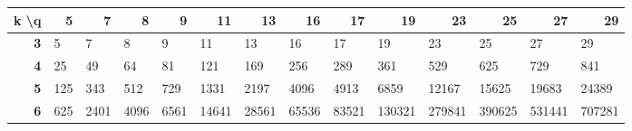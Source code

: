 \begin{table}[ht]
\centering
\tiny
\begin{tabular}{|r|lllllllllllll}
\hline
\multicolumn{1}{|l|}{\textbf{k \textbackslash q}} & \multicolumn{1}{r|}{\textbf{5}} & \multicolumn{1}{r|}{\textbf{7}} & \multicolumn{1}{r|}{\textbf{8}} & \multicolumn{1}{r|}{\textbf{9}} & \multicolumn{1}{r|}{\textbf{11}} & \multicolumn{1}{r|}{\textbf{13}} & \multicolumn{1}{r|}{\textbf{16}} & \multicolumn{1}{r|}{\textbf{17}} & \multicolumn{1}{r|}{\textbf{19}} & \multicolumn{1}{r|}{\textbf{23}} & \multicolumn{1}{r|}{\textbf{25}} & \multicolumn{1}{r|}{\textbf{27}} & \multicolumn{1}{r|}{\textbf{29}} \\ \hline
\textbf{3}                                        & \cellcolor[HTML]{FFFFFF}5       & \cellcolor[HTML]{FFFFFF}7       & \cellcolor[HTML]{FFFFFF}8       & \cellcolor[HTML]{FFFFFF}9       & \cellcolor[HTML]{FFFFFF}11       & \cellcolor[HTML]{FFFFFF}13       & \cellcolor[HTML]{FFFFFF}16       & \cellcolor[HTML]{FFFFFF}17       & \cellcolor[HTML]{FFFFFF}19       & \cellcolor[HTML]{FFFFFF}23       & \cellcolor[HTML]{FFFFFF}25       & \cellcolor[HTML]{FFFFFF}27       & \cellcolor[HTML]{FFFFFF}29       \\ \cline{1-1}
\textbf{4}                                        & \cellcolor[HTML]{FFFFFF}25      & \cellcolor[HTML]{FFFEFE}49      & \cellcolor[HTML]{FFFEFE}64      & \cellcolor[HTML]{FFFDFD}81      & \cellcolor[HTML]{FFFCFC}121      & \cellcolor[HTML]{FFFBFA}169      & \cellcolor[HTML]{FEF8F7}256      & \cellcolor[HTML]{FEF7F6}289      & \cellcolor[HTML]{FEF5F4}361      & \cellcolor[HTML]{FDF0EF}529      & \cellcolor[HTML]{FCEDEC}625      & \cellcolor[HTML]{FCEAE8}729      & \cellcolor[HTML]{FBE7E5}841      \\ \cline{1-1}
\textbf{5}                                        & \cellcolor[HTML]{FFFCFC}125     & \cellcolor[HTML]{FEF5F5}343     & \cellcolor[HTML]{FDF0EF}512     & \cellcolor[HTML]{FCEAE8}729     & \cellcolor[HTML]{F8D8D5}1331     & \cellcolor[HTML]{F3BEB9}2197     & \cellcolor[HTML]{F3BEB9}4096     & \cellcolor[HTML]{F3BEB9}4913     & \cellcolor[HTML]{F3BEB9}6859     & \cellcolor[HTML]{F3BEB9}12167    & \cellcolor[HTML]{F3BEB9}15625    & \cellcolor[HTML]{F3BEB9}19683    & \cellcolor[HTML]{F3BEB9}24389    \\ \cline{1-1}
\textbf{6}                                        & \cellcolor[HTML]{FCEDEC}625     & \cellcolor[HTML]{F3BEB9}2401    & \cellcolor[HTML]{F3BEB9}4096    & \cellcolor[HTML]{F3BEB9}6561    & \cellcolor[HTML]{F3BEB9}14641    & \cellcolor[HTML]{F3BEB9}28561    & \cellcolor[HTML]{F3BEB9}65536    & \cellcolor[HTML]{F3BEB9}83521    & \cellcolor[HTML]{F3BEB9}130321   & \cellcolor[HTML]{F3BEB9}279841   & \cellcolor[HTML]{F3BDB8}390625   & \cellcolor[HTML]{F3BDB8}531441   & \cellcolor[HTML]{F3BCB7}707281   \\ \cline{1-1}

\end{tabular}
\end{table}
